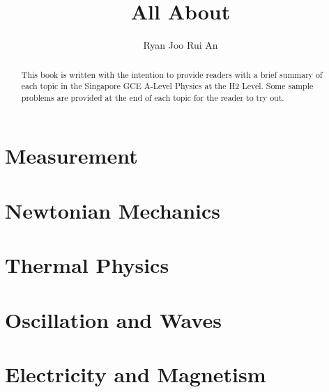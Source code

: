 \documentclass[12pt,a4 paper]{article}
\begin{document}
\begin{titlepage}
    \title{\textbf{All About\\ }}
	\author{Ryan Joo Rui An}
\end{titlepage}

\maketitle

\begin{abstract}
This book is written with the intention to provide readers with a brief summary of each topic in the Singapore GCE A-Level Physics at the H2 Level. Some sample problems are provided at the end of each topic for the reader to try out.
\end{abstract}
\pagebreak

\tableofcontents
\pagebreak

\part{Measurement}


\part{Newtonian Mechanics}







\part{Thermal Physics}



\part{Oscillation and Waves}




\part{Electricity and Magnetism}






\end{document}

